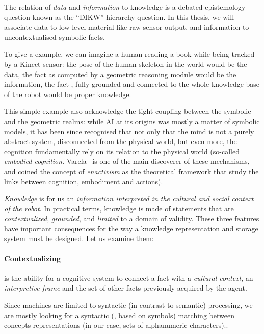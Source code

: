 The relation of \emph{data} and \emph{information} to knowledge is a debated
epistemology question known as the ``DIKW'' hierarchy question. In this thesis,
we will associate data to low-level material like raw sensor output, and
information to uncontextualised symbolic facts.

To give a example, we can imagine a human reading a book while being tracked by
a Kinect sensor: the pose of the human skeleton in the world would be the data,
the fact  as computed by a geometric reasoning
module would be the information, the fact , fully grounded and connected to the whole knowledge base of
the robot would be proper knowledge.

This simple example also acknowledge the tight coupling between the symbolic
and the geometric realms: while AI at its origins was mostly a matter of
symbolic models, it has been since recognised that not only that the mind is
not a purely abstract system, disconnected from the physical world, but even
more, the cognition fundamentally rely on its relation to the physical world
(so-called \emph{embodied cognition}. Varela~\cite{Varela1992} is one of the
main discoverer of these mechanisms, and coined the concept of
\emph{enactivism} as the theoretical framework that study the links between
cognition, embodiment and actions).

\emph{Knowledge} is for us an \emph{information interpreted in the cultural and
social context of the robot}. In practical terms, knowledge is made of
statements that are \emph{contextualized}, \emph{grounded}, and \emph{limited}
to a domain of validity. These three features have important consequences for
the way a knowledge representation and storage system must be designed. Let us
examine them:

\paragraph{Contextualizing} is the ability for a cognitive system to connect a
fact with a \emph{cultural context}, an \emph{interpretive frame} and the set
of other facts previously acquired by the agent.

Since machines are limited to syntactic (in contrast to semantic)
processing, we are mostly looking for a syntactic (\ie, based on symbols)
matching between concepts representations (in our case, sets of alphanumeric
characters)..

